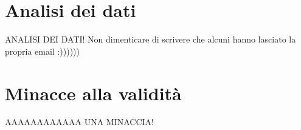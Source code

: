 \section{Analisi dei dati}
ANALISI DEI DATI!
Non dimenticare di scrivere che alcuni hanno lasciato la propria email :))))))
\section{Minacce alla validità}
AAAAAAAAAAAA UNA MINACCIA!
\newpage

